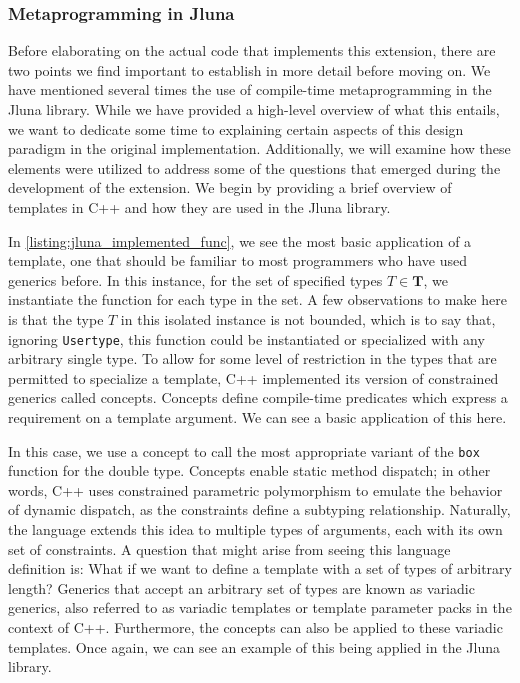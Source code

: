 \subsubsection{Metaprogramming in Jluna}

Before elaborating on the actual code that implements this extension, there are two points we find important to establish in more detail before moving on. We have mentioned several times the use of compile-time metaprogramming in the Jluna library. While we have provided a high-level overview of what this entails, we want to dedicate some time to explaining certain aspects of this design paradigm in the original implementation. Additionally, we will examine how these elements were utilized to address some of the questions that emerged during the development of the extension. We begin by providing a brief overview of templates in C++ and how they are used in the Jluna library.

\begin{listing}[ht!]
  
  \caption{Jluna implemented query function}
  \label{listing:jluna_implemented_func}
\end{listing}

In \ref{listing:jluna_implemented_func}, we see the most basic application of a template, one that should be familiar to most programmers who have used generics before. In this instance, for the set of specified types $T\in \mathbf T$, we instantiate the function for each type in the set. A few observations to make here is that the type $T$ in this isolated instance is not bounded, which is to say that, ignoring \texttt{Usertype}, this function could be instantiated or specialized with any arbitrary single type. To allow for some level of restriction in the types that are permitted to specialize a template, C++ implemented its version of constrained generics called concepts. Concepts define compile-time predicates which express a requirement on a template argument. We can see a basic application of this here.

\begin{listing}[ht!]
  
  \caption{Jluna concept function}
  \label{listing:jluna_concept_func}
\end{listing}

In this case, we use a concept to call the most appropriate variant of the \texttt{box} function for the double type. Concepts enable static method dispatch; in other words, C++ uses constrained parametric polymorphism to emulate the behavior of dynamic dispatch, as the constraints define a subtyping relationship. Naturally, the language extends this idea to multiple types of arguments, each with its own set of constraints. A question that might arise from seeing this language definition is: What if we want to define a template with a set of types of arbitrary length? Generics that accept an arbitrary set of types are known as variadic generics, also referred to as variadic templates or template parameter packs in the context of C++. Furthermore, the concepts can also be applied to these variadic templates. Once again, we can see an example of this being applied in the Jluna library.

